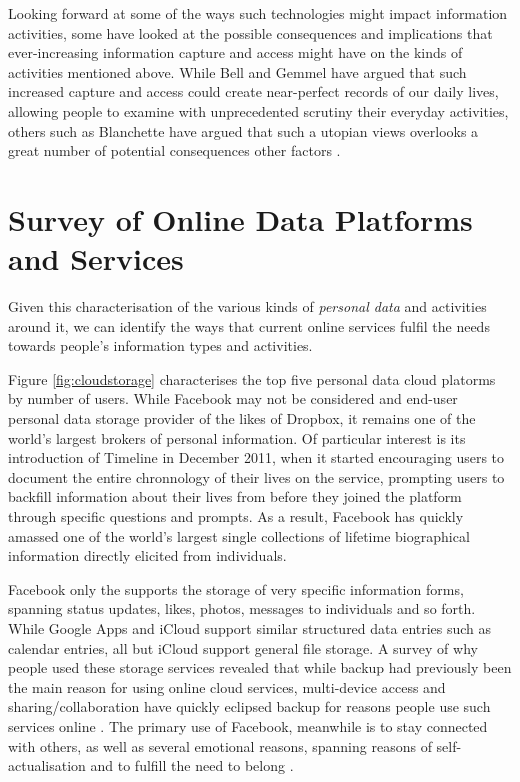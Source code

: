 \documentclass[runningheads,a4paper]{llncs}
\begin{document}
Looking forward at some of the ways such technologies might impact information activities, some have looked at the possible consequences and implications that ever-increasing information capture and access might have on the kinds of activities mentioned above.  While Bell and Gemmel have argued \cite{totalrecall} that such increased capture and access could create near-perfect records of our daily lives, allowing people to examine with unprecedented scrutiny their everyday activities, others such as Blanchette have argued that such a utopian views overlooks a great number of potential consequences other factors \cite{blanchette}.   

\section{Survey of Online Data Platforms and Services}

Given this characterisation of the various kinds of \emph{personal data} and activities around it, we can identify the ways that current online services fulfil the needs towards people's information types and activities.

Figure \ref{fig:cloudstorage} characterises the top five personal data cloud platorms by number of users. While Facebook may not be considered and end-user personal data storage provider of the likes of Dropbox, it remains one of the world's largest brokers of personal information.  Of particular interest is its introduction of Timeline in December 2011, when it started encouraging users to document the entire chronnology of their lives on the service, prompting users to backfill information about their lives from before they joined the platform through specific questions and prompts.  As a result, Facebook has quickly amassed one of the world's largest single collections of lifetime biographical information directly elicited from individuals.

Facebook only the supports the storage of very specific information forms, spanning status updates, likes, photos, messages to individuals and so forth.  While Google Apps and iCloud support similar structured data entries such as calendar entries, all but iCloud support general file storage.  A survey of why people used these storage services revealed that while backup had previously been the main reason for using online cloud services, multi-device access and sharing/collaboration have quickly eclipsed backup for reasons people use such services online \cite{listitstudy}. The primary use of Facebook, meanwhile is to stay connected with others, as well as several emotional reasons, spanning reasons of self-actualisation and to fulfill the need to belong \cite{why-do-people-facebook}.
\end{document}
